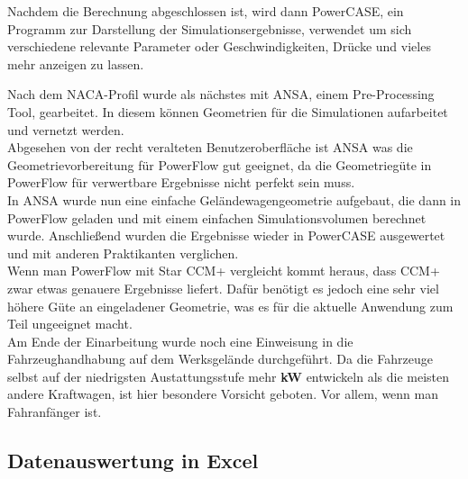 Nachdem die Berechnung abgeschlossen ist, wird dann PowerCASE, ein Programm zur Darstellung der Simulationsergebnisse, verwendet um sich verschiedene relevante Parameter oder Geschwindigkeiten, Drücke und vieles mehr anzeigen zu lassen. 

Nach dem NACA-Profil wurde als nächstes mit ANSA, einem Pre-Processing Tool, gearbeitet. In diesem können Geometrien für die Simulationen aufarbeitet und vernetzt werden. \\
Abgesehen von der recht veralteten Benutzeroberfläche ist ANSA was die Geometrievorbereitung für PowerFlow gut geeignet, da die Geometriegüte in PowerFlow für verwertbare Ergebnisse nicht perfekt sein muss. \\
In ANSA wurde nun eine einfache Geländewagengeometrie aufgebaut, die dann in PowerFlow geladen und mit einem einfachen Simulationsvolumen berechnet wurde. Anschließend wurden die Ergebnisse wieder in PowerCASE ausgewertet und mit anderen Praktikanten verglichen.\\

Wenn man PowerFlow mit Star CCM+ vergleicht kommt heraus, dass CCM+ zwar etwas genauere Ergebnisse liefert. Dafür benötigt es jedoch eine sehr viel höhere Güte an eingeladener Geometrie, was es für die aktuelle Anwendung zum Teil ungeeignet macht. \\

Am Ende der Einarbeitung wurde noch eine Einweisung in die Fahrzeughandhabung auf dem Werksgelände durchgeführt. Da die Fahrzeuge selbst auf der niedrigsten Austattungsstufe mehr \textbf{kW} entwickeln als die meisten andere Kraftwagen, ist hier besondere Vorsicht geboten. Vor allem, wenn man Fahranfänger ist. \\

\newpage
\subsection{Datenauswertung in Excel}
\label{Excel}

